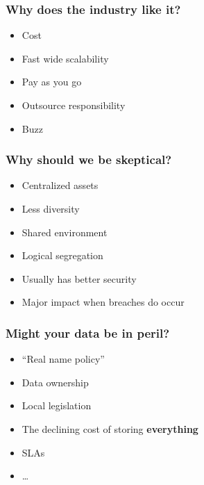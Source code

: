 \documentclass{beamer}
\begin{document}
\begin{frame}
    \frametitle{Why does the industry like it?}
    \begin{itemize}	
    \item Cost
    \item Fast wide scalability
    \item Pay as you go
    \item Outsource responsibility
    \item Buzz
    \end{itemize}
\end{frame}

\begin{frame}
    \frametitle{Why should we be skeptical?}
    \begin{itemize}	
      \item Centralized assets
      \item Less diversity
      \item Shared environment
      \item Logical segregation
      \item Usually has better security
      \item Major impact when breaches do occur
    \end{itemize}
\end{frame}

\begin{frame}
    \frametitle{Might your data be in peril?}
    \begin{itemize}	
      \item ``Real name policy''
      \item Data ownership
      \item Local legislation %
      \item The declining cost of storing \textbf{everything}
      \item SLAs
      \item \dots
    \end{itemize}
\end{frame}
\end{document}
